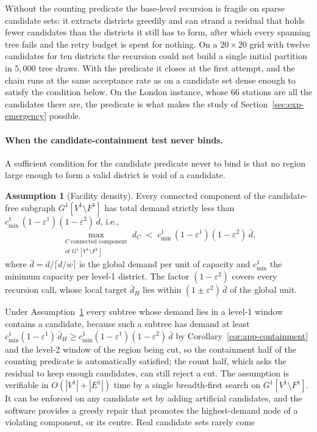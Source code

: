 \documentclass[11pt]{article}
\theoremstyle{definition}
\newtheorem{assumption}[theorem]{Assumption}
\begin{document}
Without the counting predicate the base-level recursion is fragile on
sparse candidate sets: it extracts districts greedily and can strand a
residual that holds fewer candidates than the districts it still has to
form, after which every spanning tree fails and the retry budget is spent
for nothing. On a $20\times20$ grid with twelve candidates for ten districts the recursion could not build a single initial partition in $5{,}000$ tree draws. With the predicate it closes at the first attempt, and the chain runs at the same acceptance rate as on a candidate set dense enough to satisfy the condition below. On the London instance,
whose $66$ stations are all the candidates there are, the predicate is
what makes the study of Section~\ref{sec:exp-emergency} possible.

\paragraph{When the candidate-containment test never binds.}
A sufficient condition for the candidate predicate never to bind is that
no region large enough to form a valid district is void of a candidate.
%
\begin{assumption}[Facility density]
\label{asm:facility-density}
Every connected component of the candidate-free subgraph
$G^1[V^1 \setminus F^1]$ has total demand strictly less than
$c_{\min}^{1}\,(1-\varepsilon^1)(1-\varepsilon^2)\,\bar d$, i.e.,
\[
  \max_{\substack{C\;\text{connected component} \\ \text{of } G^1[V^1\setminus F^1]}}  d_C \;<\; c_{\min}^{1}\,(1-\varepsilon^1)(1-\varepsilon^2)\,\bar d,
\]
where $\bar d = d/\lceil d/w \rceil$ is the global demand per unit of capacity and $c^1_{\min}$ the minimum capacity per level-1 district. The factor $(1-\varepsilon^2)$ covers every recursion call, whose local target $\bar d_H$ lies within $(1\pm\varepsilon^2)\,\bar d$ of the global unit.
\end{assumption}
%
Under Assumption~\ref{asm:facility-density} every subtree whose demand
lies in a level-1 window contains a candidate, because such a subtree has demand at least $c^1_{\min}(1-\varepsilon^1)\,\bar d_H \geq c^1_{\min}(1-\varepsilon^1)(1-\varepsilon^2)\,\bar d$ by Corollary~\ref{cor:app-containment} and the level-2 window of the region being cut, so the containment half of the counting predicate is automatically satisfied; the count half, which asks the residual to keep enough candidates, can still reject a cut. The assumption is verifiable in $O(|V^1|+|E^1|)$ time by a single breadth-first search on $G^1[V^1 \setminus F^1]$. It can be enforced on any candidate set by adding artificial candidates, and the software provides a greedy repair that promotes the highest-demand node of a violating component, or its centre. Real candidate sets rarely come
\end{document}
